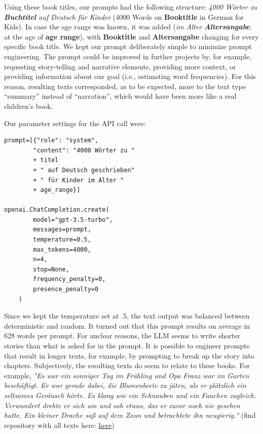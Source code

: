 \documentclass[jou, a4paper]{apa7}
\begin{document}
Using these book titles, our prompts had the following structure: \textit{4000 Wörter zu \textbf{Buchtitel} auf Deutsch für Kinder} (4000 Words on \textbf{Booktitle} in German for Kids). In case the age range was known, it was added (\textit{im Alter \textbf{Altersangabe}}; at the age of \textbf{age range}), with \textbf{Booktitle} and \textbf{Altersangabe} changing for every specific book title. We kept our prompt deliberately simple to minimize prompt engineering. The prompt could be improved in further projects by, for example, requesting story-telling and narrative elements, providing more context, or providing information about our goal (i.e., estimating word frequencies). For this reason, resulting texts corresponded, as to be expected, more to the text type “summary” instead of “narration”, which would have been more like a real children’s book.

Our parameter settings for the API call were:  

\begin{verbatim}
prompt=[{"role": "system", 
        "content": "4000 Wörter zu "
        + titel 
        + " auf Deutsch geschrieben" 
        + " für Kinder im Alter "
        + age_range}]

openai.ChatCompletion.create(
        model="gpt-3.5-turbo",  
        messages=prompt,
        temperature=0.5,
        max_tokens=4000,
        n=4,
        stop=None,
        frequency_penalty=0,
        presence_penalty=0
    )
\end{verbatim}


Since we kept the temperature set at .5, the text output was balanced between deterministic and random. It turned out that this prompt results on average in 628 words per prompt. For unclear reasons, the LLM seems to write shorter stories than what is asked for in the prompt. It is possible to engineer prompts that result in longer texts, for example, by prompting to break up the story into chapters. Subjectively, the resulting texts do seem to relate to these books. For example, \textit{"Es war ein sonniger Tag im Frühling und Opa Franz war im Garten beschäftigt. Er war gerade dabei, die Blumenbeete zu jäten, als er plötzlich ein seltsames Geräusch hörte. Es klang wie ein Schnauben und ein Fauchen zugleich. Verwundert drehte er sich um und sah etwas, das er zuvor noch nie gesehen hatte. Ein kleiner Drache saß auf dem Zaun und betrachtete ihn neugierig."} (find repository with all texts here: \href{https://github.com/jobschepens/cdp-wp2}{here})
\end{document}
